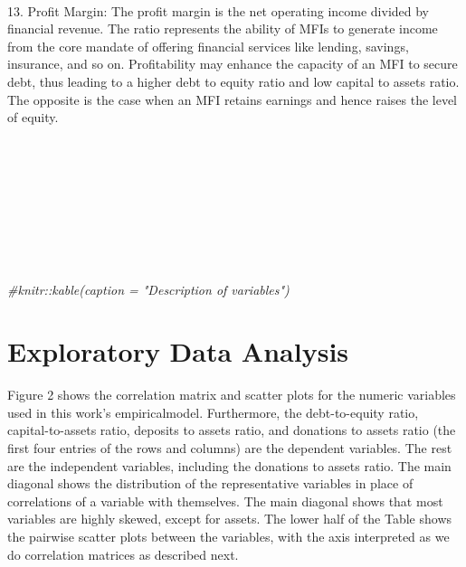 \documentclass[a4paper,nobind]{templates/ociamthesis}
\newenvironment{Shaded}{\begin{snugshade}}{\end{snugshade}}
\newcommand{\CommentTok}[1]{\textcolor[rgb]{0.56,0.35,0.01}{\textit{#1}}}
\renewenvironment{Shaded}
{
  \vspace{10pt}%
  \begin{snugshade}%
}{%
  \end{snugshade}%
  \vspace{8pt}%
}
\begin{document}
\begin{longtabu}
\addlinespace
\\
13. Profit Margin: The profit margin is the net operating income divided by financial revenue. The ratio represents the ability of MFIs to generate income from the core mandate of offering financial services like lending, savings, insurance, and so on. Profitability may enhance the capacity of an MFI to secure debt, thus leading to a higher debt to equity ratio and low capital to assets ratio. The opposite is the case when an MFI retains earnings and hence raises the level of equity.\\
\\
\bottomrule
{}\\
\\
\\
\\
\\
\\
\\
\end{longtabu}

\begin{Shaded}
\begin{Highlighting}[]
  \CommentTok{\#knitr::kable(caption = "Description of variables")}
\end{Highlighting}
\end{Shaded}

\hypertarget{exploratory-data-analysis}{%
\section{Exploratory Data Analysis}\label{exploratory-data-analysis}}

Figure 2 shows the correlation matrix and scatter plots for the numeric variables used in this work's empiricalmodel. Furthermore, the debt-to-equity ratio, capital-to-assets ratio, deposits to assets ratio, and donations to assets ratio (the first four entries of the rows and columns) are the dependent variables. The rest are the independent variables, including the donations to assets ratio. The main diagonal shows the distribution of the representative variables in place of correlations of a variable with themselves. The main diagonal shows that most variables are highly skewed, except for assets. The lower half of the Table shows the pairwise scatter plots between the variables, with the axis interpreted as we do correlation matrices as described next.
\end{document}
